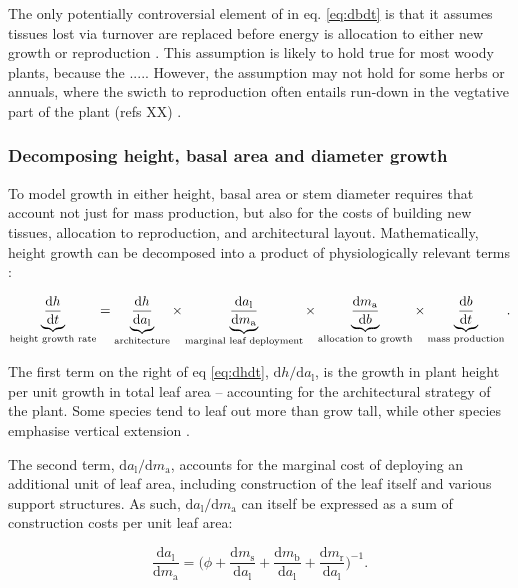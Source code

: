 \documentclass[12pt, a4paper]{article}
\begin{document}
The only potentially controversial element of in eq. \ref{eq:dbdt} is that it assumes tissues lost via turnover are replaced before energy is allocation to either new growth or reproduction \citep{Thornley-2000}. This assumption is likely to hold true for most woody plants, because the ..... However, the assumption may not hold for some herbs or annuals, where the swicth to reproduction often entails run-down in the vegtative part of the plant (refs XX) \citep{ Thornley-2000}.

\subsubsection{Decomposing height, basal area and diameter growth}

To model growth in either height, basal area or stem diameter requires that account not just for mass production, but also for the costs of building new tissues, allocation to reproduction, and architectural layout. Mathematically, height growth can be decomposed into a product of physiologically relevant terms \citep{falster-2011}:

\begin{equation} \label{eq:dhdt}
\underbrace{\strut\frac{\textrm{d}h}{\textrm{d}t}}_\textrm{height growth rate}= \underbrace{\strut\frac{\textrm{d}h}{\textrm{d}a_\textrm{l}}}_\textrm{architecture}
\times \underbrace{\strut\frac{\textrm{d}a_\textrm{l}}{\textrm{d}m_\textrm{a}}}_\textrm{marginal leaf deployment}
\times \underbrace{\strut\frac{\textrm{d}m_\textrm{a}}{\textrm{d}b}}_\textrm{allocation to growth}
\times \underbrace{\strut\frac{\textrm{d}b}{\textrm{d}t}}_\textrm{mass production}.
\end{equation}

The first term on the right of eq \ref{eq:dhdt},
$\textrm{d}h / \textrm{d}a_\textrm{l}$, is the growth in plant height
per unit growth in total leaf area -- accounting for the architectural
strategy of the plant. Some species tend to leaf out more than grow
tall, while other species emphasise vertical
extension \citep{poorter-2006}.

The second term, $\textrm{d}a_\textrm{l} / \textrm{d}m_\textrm{a}$,
accounts for the marginal cost of deploying an additional unit of leaf
area, including construction of the leaf itself and various support
structures. As such, $\textrm{d}a_\textrm{l} / \textrm{d}m_\textrm{a}$
can itself be expressed as a sum of construction costs per unit leaf
area:

\begin{equation}\label{eq:daldmt}
\frac{\textrm{d}a_\textrm{l}}{\textrm{d}m_\textrm{a}}
= \big(\phi
 + \frac{\textrm{d}m_\textrm{s}}{\textrm{d}a_\textrm{l}} + \frac{\textrm{d}m_\textrm{b}}{\textrm{d}a_\textrm{l}} + \frac{\textrm{d}m_\textrm{r}}{\textrm{d}a_\textrm{l}}\big)^{-1}.
\end{equation}
\end{document}
